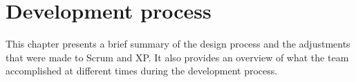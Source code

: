 \chapter{Development process}
\label{sec:devProcess}
This chapter presents a brief summary of the design process and the adjustments that  were made to Scrum and XP. It also provides an overview of what the team accomplished at different times during the development process. 




